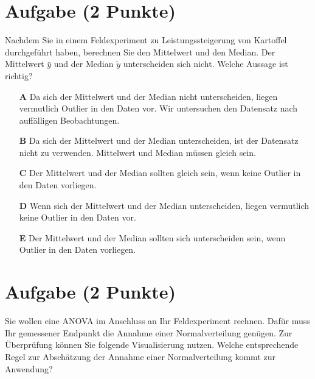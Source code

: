 \documentclass[a4paper, 9pt]{scrartcl}\usepackage[]{graphicx}\usepackage[]{xcolor}
\begin{document}
\section{Aufgabe \hfill (2 Punkte)}



Nachdem Sie in einem Feldexperiment zu Leistungssteigerung von Kartoffel durchgeführt haben, berechnen Sie den Mittelwert und den Median. Der Mittelwert $\bar{y}$ und der Median $\tilde{y}$ unterscheiden sich nicht. Welche Aussage ist richtig?



\begin{enumerate}
\item [\textbf{A} \msquare] Da sich der Mittelwert und der Median nicht unterscheiden, liegen vermutlich Outlier in den Daten vor. Wir untersuchen den Datensatz nach auffälligen Beobachtungen.
\item [\textbf{B} \msquare] Da sich der Mittelwert und der Median unterscheiden, ist der Datensatz nicht zu verwenden. Mittelwert und Median müssen gleich sein.
\item [\textbf{C} \msquare] Der Mittelwert und der Median sollten gleich sein, wenn keine Outlier in den Daten vorliegen. 
\item [\textbf{D} \msquare] Wenn sich der Mittelwert und der Median unterscheiden, liegen vermutlich keine Outlier in den Daten vor.
\item [\textbf{E} \msquare] Der Mittelwert und der Median sollten sich unterscheiden sein, wenn Outlier in den Daten vorliegen. 
\end{enumerate}

\section{Aufgabe \hfill (2 Punkte)}



Sie wollen eine ANOVA im Anschluss an Ihr Feldexperiment rechnen. Dafür muss Ihr gemessener Endpunkt die Annahme einer Normalverteilung genügen. Zur Überprüfung können Sie folgende Visualisierung nutzen. Welche entsprechende Regel zur Abschätzung der Annahme einer Normalverteilung kommt zur Anwendung?
\end{document}
